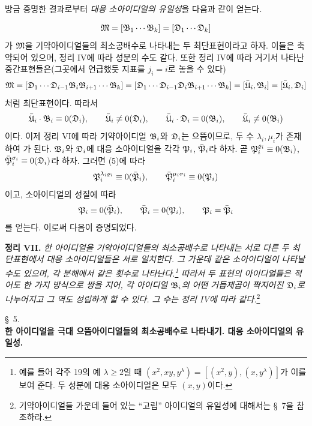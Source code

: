 방금 증명한 결과로부터 \emph{대응 소아이디얼의 유일성}을 다음과 같이 얻는다.

\[
 \mathfrak{M}=[\mathfrak{B}_1\cdots\mathfrak{B}_k]=[\mathfrak{D}_1\cdots\mathfrak{D}_k]
\]
가 $\mathfrak{M}$을 기약아이디얼들의 최소공배수로 나타내는 두 최단표현이라고 하자. 이들은 축약되어 있으며, 정리 IV에 따라 성분의 수도 같다. 또한 정리 IV에 따라 거기서 나타난 중간표현들은(그곳에서 언급했듯 지표를 $j_i=i$로 놓을 수 있다)
\[
 \mathfrak{M}=[\mathfrak{D}_1\cdots\mathfrak{D}_{i-1}\mathfrak{B}_i\mathfrak{B}_{i+1}\cdots\mathfrak{B}_k]
       =[\mathfrak{D}_1\cdots\mathfrak{D}_{i-1}\mathfrak{D}_i\mathfrak{B}_{i+1}\cdots\mathfrak{B}_k]
       =[\bar{\mathfrak{U}}_i,\mathfrak{B}_i]=[\bar{\mathfrak{U}}_i,\mathfrak{D}_i]
\]
처럼 최단표현이다. 따라서
\[
 \bar{\mathfrak{U}}_i\cdot\mathfrak{B}_i\equiv0(\mathfrak{D}_i),\qquad
 \bar{\mathfrak{U}}_i\not\equiv0(\mathfrak{D}_i),
 \qquad
 \bar{\mathfrak{U}}_i\cdot\mathfrak{D}_i\equiv0(\mathfrak{B}_i),\qquad
 \bar{\mathfrak{U}}_i\not\equiv0(\mathfrak{B}_i)
\]
이다. 이제 정리 VI에 따라 기약아이디얼 $\mathfrak{B}_i$와 $\mathfrak{D}_i$는 으뜸이므로, 두 수 $\lambda_i,\mu_i$가 존재하여
가 된다. $\mathfrak{B}_i$와 $\mathfrak{D}_i$에 대응 소아이디얼을 각각 $\mathfrak{P}_i$, $\bar{\mathfrak{P}}_i$라 하자. 곧 $\mathfrak{P}_i^{\varrho_i}\equiv0(\mathfrak{B}_i)$, $\bar{\mathfrak{P}}_i^{\sigma_i}\equiv0(\mathfrak{D}_i)$라 하자. 그러면 (5)에 따라
\[
 \mathfrak{P}_i^{\lambda_i\varrho_i}\equiv0(\bar{\mathfrak{P}}_i),
 \qquad
 \bar{\mathfrak{P}}_i^{\mu_i\sigma_i}\equiv0(\mathfrak{P}_i)
\]
이고, 소아이디얼의 성질에 따라
\[
 \mathfrak{P}_i\equiv0(\bar{\mathfrak{P}}_i),
 \qquad
 \bar{\mathfrak{P}}_i\equiv0(\mathfrak{P}_i),
 \qquad
 \mathfrak{P}_i=\bar{\mathfrak{P}}_i
\]
를 얻는다. 이로써 다음이 증명되었다.

\textbf{정리 VII.} \emph{한 아이디얼을 기약아이디얼들의 최소공배수로 나타내는 서로 다른 두 최단표현에서 대응 소아이디얼들은 서로 일치한다. 그 가운데 같은 소아이디얼이 나타날 수도 있으며, 각 분해에서 같은 횟수로 나타난다.\footnote{예를 들어 각주 19의 예 $\lambda\ge2$일 때 $(x^2,xy,y^\lambda)=[(x^2,y),(x,y^\lambda)]$가 이를 보여 준다. 두 성분에 대응 소아이디얼은 모두 $(x,y)$이다.} 따라서 두 표현의 아이디얼들은 적어도 한 가지 방식으로 쌍을 지어, 각 아이디얼 $\mathfrak{B}_i$의 어떤 거듭제곱이 짝지어진 $\mathfrak{D}_i$로 나누어지고 그 역도 성립하게 할 수 있다. 그 수는 정리 IV에 따라 같다.}\footnote{기약아이디얼들 가운데 들어 있는 ``고립'' 아이디얼의 유일성에 대해서는 \S~7을 참조하라.}

\begin{center}
\S~5.\\[0.25em]
\textbf{한 아이디얼을 극대 으뜸아이디얼들의 최소공배수로 나타내기. 대응 소아이디얼의 유일성.}
\end{center}

